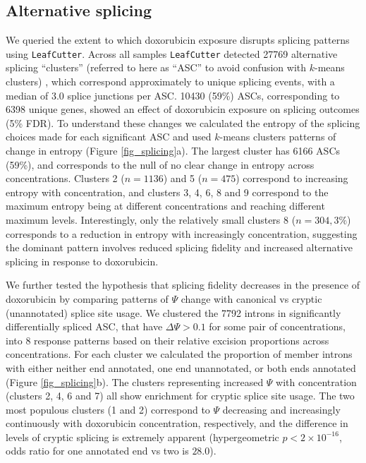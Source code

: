 \documentclass{article}
\begin{document}
{\subsection*{Alternative splicing} 


We queried the extent to which doxorubicin exposure disrupts splicing patterns using \texttt{LeafCutter}\cite{leafcutter}. Across all samples \texttt{LeafCutter} detected 27769 alternative splicing ``clusters'' (referred to here as ``ASC'' to avoid confusion with $k$-means clusters) , which correspond approximately to unique splicing events, with a median of 3.0 splice junctions per ASC. 10430 (59\%) ASCs, corresponding to 6398 unique genes, showed an effect of doxorubicin exposure on splicing outcomes (5\% FDR). To understand these changes we calculated the entropy of the splicing choices made for each significant ASC and used $k$-means clusters patterns of change in entropy (Figure \ref{fig_splicing}a). The largest cluster has 6166 ASCs (59\%), and corresponds to the null of no clear change in entropy across concentrations. Clusters 2 ($n=1136$) and 5 ($n=475$) correspond to increasing entropy with concentration, and clusters 3, 4, 6, 8 and 9 correspond to the maximum entropy being at different concentrations and reaching different maximum levels. Interestingly, only the relatively small clusters 8 ($n=304, 3\%$) corresponds to a reduction in entropy with increasingly concentration, suggesting the dominant pattern involves reduced splicing fidelity and increased alternative splicing in response to doxorubicin. 

We further tested the hypothesis that splicing fidelity decreases in the presence of doxorubicin by comparing patterns of $\Psi$ change with canonical vs cryptic (unannotated) splice site usage. We clustered the 7792 introns in significantly differentially spliced ASC, that have $\Delta \Psi > 0.1$ for some pair of concentrations, into 8 response patterns based on their relative excision proportions across concentrations. For each cluster we calculated the proportion of member introns with either neither end annotated, one end unannotated, or both ends annotated (Figure \ref{fig_splicing}b). The clusters representing increased $\Psi$ with concentration (clusters 2, 4, 6 and 7) all show enrichment for cryptic splice site usage. The two most populous clusters (1 and 2) correspond to $\Psi$ decreasing and increasingly continuously with doxorubicin concentration, respectively, and the difference in levels of cryptic splicing is extremely apparent (hypergeometric $p < 2 \times 10^{-16}$, odds ratio for one annotated end vs two is $28.0$).

}
\end{document}
